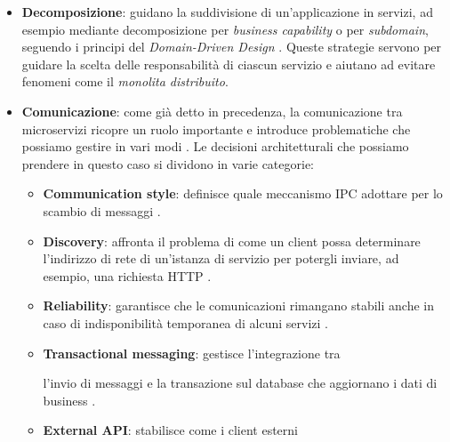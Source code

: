 \begin{itemize}
\item \textbf{Decomposizione}: guidano la suddivisione di un’applicazione in servizi, ad esempio mediante decomposizione per \textit{business capability} o per \textit{subdomain}, seguendo i principi del \textit{Domain-Driven Design} \cite{Richardson2018}. Queste strategie servono per guidare la scelta delle responsabilità di ciascun servizio e aiutano ad evitare fenomeni come il \textit{monolita distribuito}.
\item \textbf{Comunicazione}: come già detto in precedenza, la comunicazione tra microservizi ricopre un ruolo importante e introduce problematiche che possiamo gestire in vari modi \cite{Richardson2018}. Le decisioni architetturali che possiamo prendere in questo caso si dividono in varie categorie: 
    \begin{itemize}
      \item \textbf{Communication style}: definisce quale meccanismo IPC adottare per lo scambio di messaggi \cite{Richardson2018}.
      \item \textbf{Discovery}: affronta il problema di come un client possa determinare l’indirizzo di rete di un’istanza di servizio per potergli inviare, ad esempio, una richiesta HTTP \cite{Richardson2018}.
      \item \textbf{Reliability}: garantisce che le comunicazioni rimangano stabili anche in caso di indisponibilità temporanea di alcuni servizi \cite{Richardson2018}.
      \item \textbf{Transactional messaging}: gestisce l'integrazione tra 
      
      l'invio di messaggi e la transazione sul database che aggiornano i dati di business \cite{Richardson2018}.
      \item \textbf{External API}: stabilisce come i client esterni 
      

\end{itemize}
\end{itemize}
